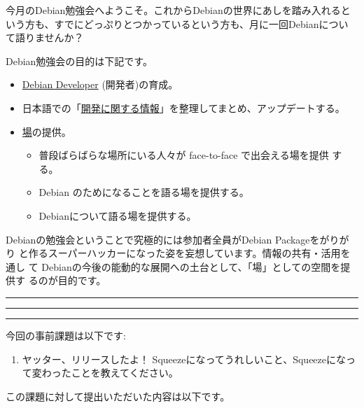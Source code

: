 \documentclass[mingoth,a4paper]{jsarticle}
\begin{document}
\begin{multicols}{2}
 

 今月のDebian勉強会へようこそ。これからDebianの世界にあしを踏み入れると
 いう方も、すでにどっぷりとつかっているという方も、月に一回Debianについ
 て語りませんか？

 Debian勉強会の目的は下記です。

 \begin{itemize}
 \item \underline{Debian Developer} (開発者)の育成。
 \item 日本語での「\underline{開発に関する情報}」を整理してまとめ、アップデートする。
 \item \underline{場}の提供。
 \begin{itemize}
  \item 普段ばらばらな場所にいる人々が face-to-face で出会える場を提供
	する。
  \item Debian のためになることを語る場を提供する。
  \item Debianについて語る場を提供する。
 \end{itemize}
 \end{itemize}		

 Debianの勉強会ということで究極的には参加者全員がDebian Packageをがりがり
 と作るスーパーハッカーになった姿を妄想しています。情報の共有・活用を通し
 て Debianの今後の能動的な展開への土台として、「場」としての空間を提供す
 るのが目的です。

\end{multicols}

\newpage

\begin{minipage}[b]{0.2\hsize}
 \colorbox{titleback}{}
\end{minipage}
\begin{minipage}[b]{0.8\hsize}
\hrule
\vspace{2mm}
\hrule
\begin{multicols}{2}
\tableofcontents
\end{multicols}
\vspace{2mm}
\hrule
\end{minipage}


今回の事前課題は以下です:
\begin{enumerate}
 \item ヤッター、リリースしたよ！ Squeezeになってうれしいこと、Squeezeになって変わったことを教えてください。
\end{enumerate}
この課題に対して提出いただいた内容は以下です。
\begin{multicols}{2}
{\small
 
}
\end{multicols}
\end{document}
